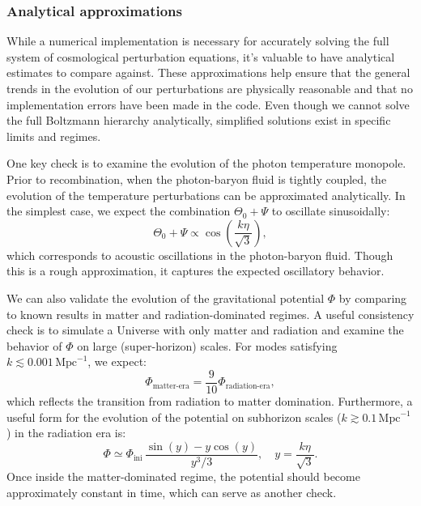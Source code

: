 \documentclass{aa}
\numberwithin{equation}{section}
\numberwithin{table}{section}
\numberwithin{figure}{section}
\begin{document}
\subsubsection{Analytical approximations}
While a numerical implementation is necessary for accurately solving the full system of cosmological perturbation equations, it's valuable to have analytical estimates to compare against. These approximations help ensure that the general trends in the evolution of our perturbations are physically reasonable and that no implementation errors have been made in the code. Even though we cannot solve the full Boltzmann hierarchy analytically, simplified solutions exist in specific limits and regimes.

One key check is to examine the evolution of the photon temperature monopole. Prior to recombination, when the photon-baryon fluid is tightly coupled, the evolution of the temperature perturbations can be approximated analytically. In the simplest case, we expect the combination $\Theta_0 + \Psi$ to oscillate sinusoidally:
\begin{equation}
\Theta_0 + \Psi \propto \cos\left(\frac{k\eta}{\sqrt{3}}\right),
\end{equation}
which corresponds to acoustic oscillations in the photon-baryon fluid. Though this is a rough approximation, it captures the expected oscillatory behavior. 

We can also validate the evolution of the gravitational potential $\Phi$ by comparing to known results in matter and radiation-dominated regimes. A useful consistency check is to simulate a Universe with only matter and radiation and examine the behavior of $\Phi$ on large (super-horizon) scales. For modes satisfying $k \lesssim 0.001\,\text{Mpc}^{-1}$, we expect:
\begin{equation}
\Phi_\text{matter-era} = \frac{9}{10} \Phi_\text{radiation-era},
\end{equation}
which reflects the transition from radiation to matter domination. Furthermore, a useful form for the evolution of the potential on subhorizon scales ($k \gtrsim 0.1\,\text{Mpc}^{-1}$) in the radiation era is:
\begin{equation}
\Phi \simeq \Phi_\text{ini} \, \frac{\sin(y) - y \cos(y)}{y^3 / 3}, \quad y = \frac{k\eta}{\sqrt{3}}.
\end{equation}
Once inside the matter-dominated regime, the potential should become approximately constant in time, which can serve as another check.
\end{document}
